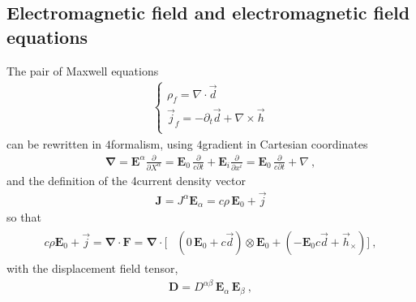 \documentclass[letterpaper,10pt,english]{jupyterBook}
\begin{document}
\subsection{Electromagnetic field and electromagnetic field equations}
\label{\detokenize{ch/relativity-special/notes:electromagnetic-field-and-electromagnetic-field-equations}}
\sphinxAtStartPar
The pair of Maxwell equations
\begin{equation*}
\begin{split}\begin{cases}
  \rho_f    = \nabla \cdot \vec{d}  \\
  \vec{j}_f = - \partial_t \vec{d} + \nabla \times \vec{h}  \\
\end{cases}\end{split}
\end{equation*}
\sphinxAtStartPar
can be re\sphinxhyphen{}written in \(4\)\sphinxhyphen{}formalism, using \(4\)\sphinxhyphen{}gradient in Cartesian coordinates
\begin{equation*}
\begin{split}\symbf{\nabla} = \mathbf{E}^{\alpha} \frac{\partial}{\partial X^{\alpha}}
 = \mathbf{E}_0 \, \frac{\partial }{c \partial t} + \mathbf{E}_i \frac{\partial}{\partial x^i}
 = \mathbf{E}_0 \, \frac{\partial }{c \partial t} + \nabla \ ,\end{split}
\end{equation*}
\sphinxAtStartPar
and the definition of the 4\sphinxhyphen{}current density vector
\begin{equation*}
\begin{split}\mathbf{J} = J^{\alpha} \mathbf{E}_{\alpha} = c \rho \, \mathbf{E}_0 + \vec{j}\end{split}
\end{equation*}
\sphinxAtStartPar
so that
\begin{equation*}
\begin{split}\begin{aligned}
  c \rho \mathbf{E}_0 + \vec{j} = \symbf{\nabla} \cdot \mathbf{F} 
  = \symbf{\nabla} \cdot
   [ & ( 0\, \mathbf{E}_0 + c \vec{d} ) \otimes \mathbf{E}_0 + ( - \mathbf{E}_0 c \vec{d} + \vec{h}_{\times} ) ] \ ,
\end{aligned}\end{split}
\end{equation*}
\sphinxAtStartPar
with the displacement field tensor,
\begin{equation*}
\begin{split}\mathbf{D} = D^{\alpha \beta} \, \mathbf{E}_{\alpha} \, \mathbf{E}_{\beta} \ , \end{split}
\end{equation*}
\end{document}
